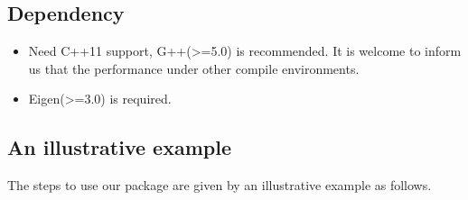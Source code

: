 \documentclass[a4paper]{article}
\begin{document}
  \subsection{Dependency}
  \begin{itemize}
    \item Need C++11 support, G++(>=5.0) is recommended. It is 
    welcome to inform us that the performance under other compile 
    environments.
    \item Eigen(>=3.0) is required.
  \end{itemize}
  
  \subsection{An illustrative example}
  The steps to use our package are given by an illustrative example 
  as follows.
\end{document}
